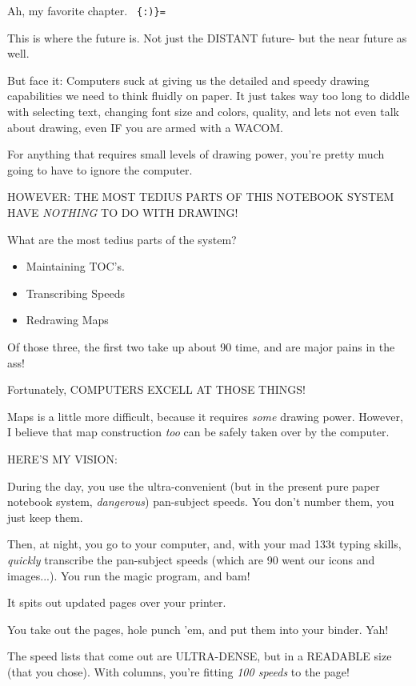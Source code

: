 \documentclass[oneside]{book}
\begin{document}
Ah, my favorite chapter. \verb| {:)}= |

This is where the future is. Not just the DISTANT future- but the near
future as well.

But face it: Computers suck at giving us the detailed and speedy
drawing capabilities we need to think fluidly on paper. It just takes
way too long to diddle with selecting text, changing font size and
colors, quality, and lets not even talk about drawing, even IF you are
armed with a WACOM.

For anything that requires small levels of drawing power, you're
pretty much going to have to ignore the computer.

HOWEVER: THE MOST TEDIUS PARTS OF THIS NOTEBOOK SYSTEM HAVE \emph{NOTHING}
TO DO WITH DRAWING!

What are the most tedius parts of the system?

\begin{itemize}
\item Maintaining TOC's.
\item Transcribing Speeds
\item Redrawing Maps
\end{itemize}

Of those three, the first two take up about 90%
time, and are major pains in the ass!

Fortunately, COMPUTERS EXCELL AT THOSE THINGS!

Maps is a little more difficult, because it requires \emph{some} drawing
power. However, I believe that map construction \emph{too} can be safely
taken over by the computer.

HERE'S MY VISION:

During the day, you use the ultra-convenient (but in the present pure
paper notebook system, \emph{dangerous}) pan-subject speeds. You don't
number them, you just keep them.

Then, at night, you go to your computer, and, with your mad 133t
typing skills, \emph{quickly} transcribe the pan-subject speeds (which are
90%
went our icons and images...). You run the magic program, and bam!

It spits out updated pages over your printer.

You take out the pages, hole punch 'em, and put them into your
binder. Yah!

The speed lists that come out are ULTRA-DENSE, but in a READABLE size
(that you chose). With columns, you're fitting \emph{100 speeds} to the
page!
\end{document}

